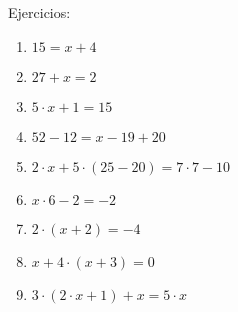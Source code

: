 Ejercicios:

\begin{enumerate}
\renewcommand{\labelenumi}{{\theenumi})}
\item $15=x+4$
\item $27+x=2$
\item $5\cdot x + 1 = 15$
\item $ 52-12 = x-19+20$
\item $2\cdot x +5\cdot ( 25-20) = 7\cdot7 -10$
\item $x\cdot6 -2 = -2$
\item $2\cdot(x+2)=-4$
\item $x+4\cdot(x+3)=0$
\item $3\cdot(2\cdot x+1)+x=5\cdot x$
\end{enumerate}